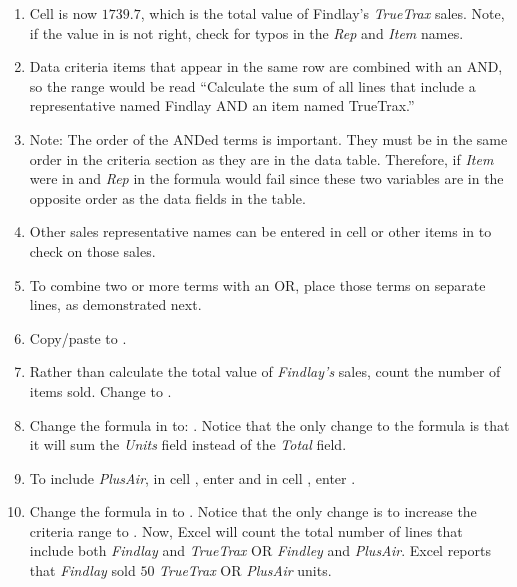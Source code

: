 \begin{enumerate}
	\item Cell  is now $ 1739.7 $, which is the total value of Findlay's \textit{TrueTrax} sales. Note, if the value in  is not right, check for typos in the \textit{Rep} and \textit{Item} names.
	\item Data criteria items that appear in the same row are combined with an AND, so the range  would be read ``Calculate the sum of all lines that include a representative named Findlay AND an item named TrueTrax.''
	\item Note: The order of the ANDed terms is important. They must be in the same order in the criteria section as they are in the data table. Therefore, if \textit{Item} were in  and \textit{Rep} in  the formula would fail since these two variables are in the opposite order as the data fields in the table.
	\item Other sales representative names can be entered in cell  or other items in  to check on those sales.
	\item To combine two or more terms with an OR, place those terms on separate lines, as demonstrated next.
	\item Copy/paste  to .
	\item Rather than calculate the total value of \textit{Findlay's} sales, count the number of items sold. Change  to .
	\item Change the formula in  to: . Notice that the only change to the formula is that it will sum the \textit{Units} field instead of the \textit{Total} field.
	\item To include \textit{PlusAir}, in cell , enter  and in cell , enter .
	\item Change the formula in  to . Notice that the only change is to increase the criteria range to . Now, Excel will count the total number of lines that include both \textit{Findlay} and \textit{TrueTrax} OR \textit{Findley} and \textit{PlusAir}. Excel reports that \textit{Findlay} sold $ 50 $ \textit{TrueTrax} OR \textit{PlusAir} units.
	

\end{enumerate}
